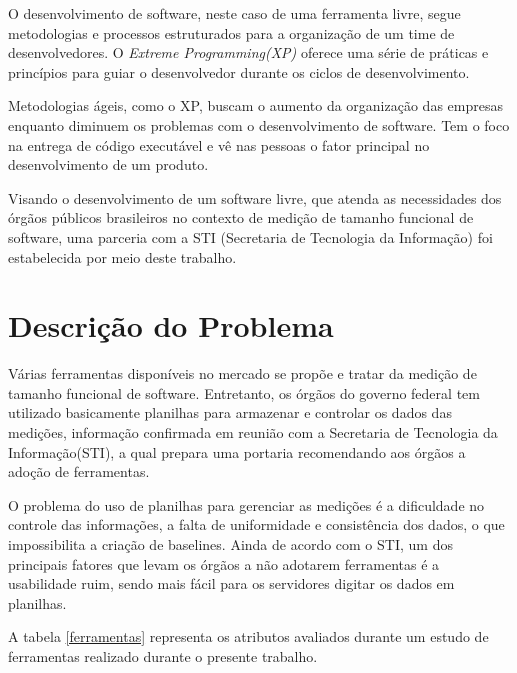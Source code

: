 O desenvolvimento de software, neste caso de uma ferramenta livre, segue metodologias e processos estruturados para a organização de um time de desenvolvedores. O \textit{Extreme Programming(XP)} oferece uma série de práticas e princípios para guiar o desenvolvedor durante os ciclos de desenvolvimento.

Metodologias ágeis, como o XP, buscam o aumento da organização das empresas enquanto diminuem os problemas com o desenvolvimento de software. Tem o foco na entrega de código executável e vê nas pessoas o fator principal no desenvolvimento de um produto. \cite{Maurer:2002}

Visando o desenvolvimento de um software livre, que atenda as necessidades dos órgãos públicos brasileiros no contexto de medição de tamanho funcional de software, uma parceria com a STI (Secretaria de Tecnologia da Informação) foi estabelecida por meio deste trabalho.

\section{Descrição do Problema}

Várias ferramentas disponíveis no mercado se propõe e tratar da medição de tamanho funcional de software. Entretanto, os órgãos do governo federal tem utilizado basicamente planilhas para armazenar e controlar os dados das medições, informação confirmada em reunião com a Secretaria de Tecnologia da Informação(STI), a qual prepara uma portaria recomendando aos órgãos a adoção de ferramentas.

O problema do uso de planilhas para gerenciar as medições é a dificuldade no controle das informações, a falta de uniformidade e consistência dos dados, o que impossibilita a criação de baselines. Ainda de acordo com o STI, um dos principais fatores que levam os órgãos a não adotarem ferramentas é a usabilidade ruim, sendo mais fácil para os servidores digitar os dados em planilhas.

A tabela \ref{ferramentas} representa os atributos avaliados durante um estudo de ferramentas realizado durante o presente trabalho.

